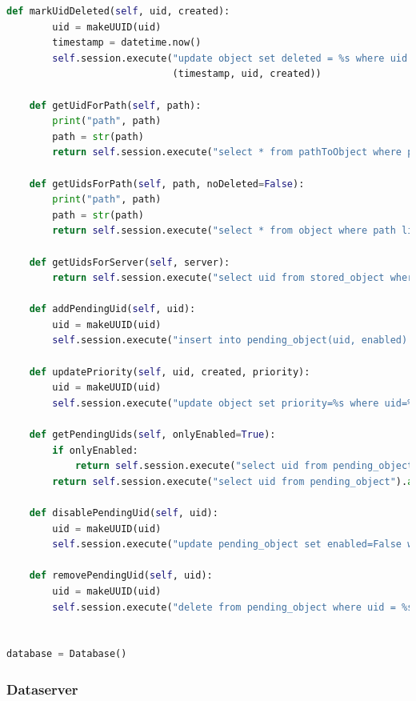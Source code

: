\documentclass{article}
\begin{document}
\begin{lstlisting}[language=Python, title=Codice]
    def markUidDeleted(self, uid, created):
        uid = makeUUID(uid)
        timestamp = datetime.now()
        self.session.execute("update object set deleted = %s where uid = %s and created = %s",
                             (timestamp, uid, created))

    def getUidForPath(self, path):
        print("path", path)
        path = str(path)
        return self.session.execute("select * from pathToObject where path = %s", (path, )).one()

    def getUidsForPath(self, path, noDeleted=False):
        print("path", path)
        path = str(path)
        return self.session.execute("select * from object where path like %s", (path, )).all()

    def getUidsForServer(self, server):
        return self.session.execute("select uid from stored_object where server = %s allow filtering", (server, ))

    def addPendingUid(self, uid):
        uid = makeUUID(uid)
        self.session.execute("insert into pending_object(uid, enabled) values (%s, True)", (uid, ))

    def updatePriority(self, uid, created, priority):
        uid = makeUUID(uid)
        self.session.execute("update object set priority=%s where uid=%s and created=%s", (priority, uid, created))

    def getPendingUids(self, onlyEnabled=True):
        if onlyEnabled:
            return self.session.execute("select uid from pending_object where enabled=True allow filtering").all()
        return self.session.execute("select uid from pending_object").all()

    def disablePendingUid(self, uid):
        uid = makeUUID(uid)
        self.session.execute("update pending_object set enabled=False where uid = %s", (uid, ))

    def removePendingUid(self, uid):
        uid = makeUUID(uid)
        self.session.execute("delete from pending_object where uid = %s", (uid, ))


database = Database()
\end{lstlisting}



\subsubsection{Dataserver}
\end{document}

